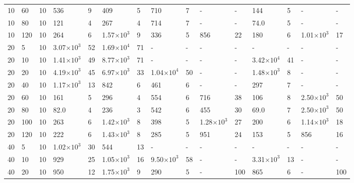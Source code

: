 \begin{table}[!ht]
\begin{center}
{\begin{tabular}{|l|l|l||l|l|l|l|l|l||l|l|l|l|l|l|}
10	&	60	&	10	&	536	&	9	&	409	&	5	&	710	&	7	&	-	&	-	&	144	&	5	&	-	&	-	\\



10	&	80	&	10	&	121	&	4	&	267	&	4	&	714	&	7	&	-	&	-	&	74.0	&	5	&	-	&	-	\\

10	&	120	&	10	&	264	&	6	&	1.57$\times10^3$	&	9	&	336	&	5	&	856	&	22	&	180	&	6	&	1.01$\times10^3$	&	17	\\

20	&	5	&	10	&	3.07$\times10^3$	&	52	&	1.69$\times10^4$	&	71	&	-	&	-	&	-	&	-	&	-	&	-	&	-	&	-	\\
20	&	10	&	10	&	1.41$\times10^3$	&	49	&	8.77$\times10^3$	&	71	&	-	&	-	&	-	&	-	&	3.42$\times10^4$	&	41	&	-	&	-	\\

20	&	20	&	10	&	4.19$\times10^3$	&	45	&	6.97$\times10^3$	&	33	&	1.04$\times10^4$	&	50	&	-	&	-	&	1.48$\times10^3$	&	8	&	-	&	-	\\



20	&	40	&	10	&	1.17$\times10^3$	&	13	&	842	&	6	&	461	&	6	&	-	&	-	&	297	&	7	&	-	&	-	\\



20	&	60	&	10	&	161	&	5	&	296	&	4	&	554	&	6	&	716	&	38	&	106	&	8	&	2.50$\times10^3$	&	50	\\



20	&	80	&	10	&	82.0	&	4	&	236	&	3	&	542	&	6	&	455	&	30	&	69.0	&	7	&	2.50$\times10^3$	&	50	\\
20	&	100	&	10	&	263	&	6	&	1.42$\times10^3$	&	8	&	398	&	5	&	1.28$\times10^3$	&	27	&	200	&	6	&	1.14$\times10^3$	&	18	\\

20	&	120	&	10	&	222	&	6	&	1.43$\times10^3$	&	8	&	285	&	5	&	951	&	24	&	153	&	5	&	856	&	16	\\



40	&	5	&	10	&	1.02$\times10^3$	&	30	&	544	&	13	&	-	&	-	&	-	&	-	&	-	&	-	&	-	&	-	\\
40	&	10	&	10	&	929	&	25	&	1.05$\times10^3$	&	16	&	9.50$\times10^3$	&	58	&	-	&	-	&	3.31$\times10^3$	&	13	&	-	&	-	\\

40	&	20	&	10	&	950	&	12	&	1.75$\times10^3$	&	9	&	290	&	5	&	-	&	100	&	865	&	6	&	-	&	100	\\




\end{tabular}}
\end{center}
\end{table}

